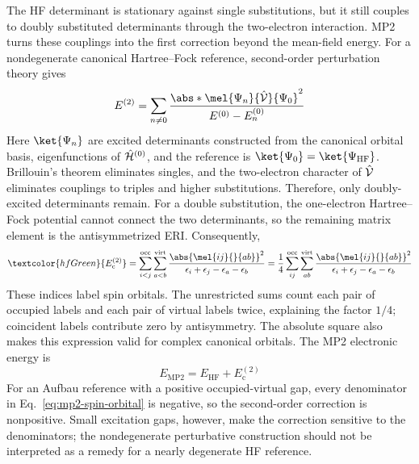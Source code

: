 \documentclass[11pt,a4paper,titlepage]{article}
\numberwithin{equation}{section}
\newcommand{\Ec}{E_\text{c}}
\newcommand{\chH}{\Hat{\mathcal{H}}}
\newcommand{\chV}{\Hat{\mathcal{V}}}
\newcommand{\green}[1]{\textcolor{hfGreen}{#1}}
\begin{document}
The HF determinant is stationary against single substitutions, but it still
couples to doubly substituted determinants through the two-electron
interaction. MP2 turns these couplings into the first correction beyond the
mean-field energy. For a nondegenerate canonical Hartree--Fock reference,
second-order perturbation theory gives
\begin{equation}
  E^{(2)}
  =\sum_{n\ne0}
    \frac{\abs*{\mel{\Psi_n}{\chV}{\Psi_0}}^2}
      {E^{(0)}-E_n^{(0)}}
\end{equation}
Here $\ket{\Psi_n}$ are excited determinants constructed from the canonical orbital
basis, eigenfunctions of $\chH^{(0)}$, and the reference is
$\ket{\Psi_0}=\ket{\Psi_\text{HF}}$. Brillouin's theorem eliminates
singles, and the two-electron character of $\chV$ eliminates couplings to
triples and higher substitutions. Therefore, only doubly-excited determinants
remain. For a double substitution, the one-electron Hartree--Fock potential cannot
connect the two determinants, so the remaining matrix element is the antisymmetrized
ERI. Consequently,
\begin{equation}
  \green{\Ec^{(2)}}
  =\sum_{i<j}^{\text{occ}}\sum_{a<b}^{\text{virt}}
    \frac{\abs{\mel{ij}{}{ab}}^2}
      {\epsilon_i+\epsilon_j-\epsilon_a-\epsilon_b}
  =\frac14\sum_{ij}^{\text{occ}}\sum_{ab}^{\text{virt}}
    \frac{\abs{\mel{ij}{}{ab}}^2}
      {\epsilon_i+\epsilon_j-\epsilon_a-\epsilon_b}
  \label{eq:mp2-spin-orbital}
\end{equation}
These indices label spin orbitals. The unrestricted sums count each pair of
occupied labels and each pair of virtual labels twice, explaining the factor
$1/4$; coincident labels contribute zero by antisymmetry. The absolute square
also makes this expression valid for complex canonical orbitals. The MP2
electronic energy is
\begin{equation}
  E_\text{MP2}=E_\text{HF}+\Ec^{(2)}
\end{equation}
For an Aufbau reference with a positive occupied-virtual gap, every
denominator in Eq.~\eqref{eq:mp2-spin-orbital} is negative, so the
second-order correction is nonpositive. Small excitation gaps, however,
make the correction sensitive to the denominators; the nondegenerate
perturbative construction should not be interpreted as a remedy for a
nearly degenerate HF reference.
\end{document}
